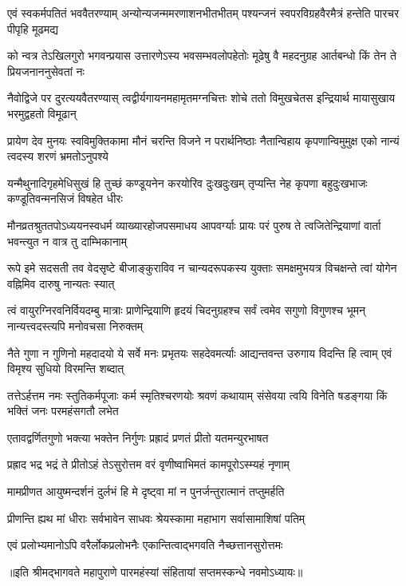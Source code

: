 \fourlineindentedshloka
{एवं स्वकर्मपतितं भववैतरण्याम्}
{अन्योन्यजन्ममरणाशनभीतभीतम्}
{पश्यन्जनं स्वपरविग्रहवैरमैत्रं}
{हन्तेति पारचर पीपृहि मूढमद्य} %

\fourlineindentedshloka
{को न्वत्र तेऽखिलगुरो भगवन्प्रयास}
{उत्तारणेऽस्य भवसम्भवलोपहेतोः}
{मूढेषु वै महदनुग्रह आर्तबन्धो}
{किं तेन ते प्रियजनाननुसेवतां नः} %

\fourlineindentedshloka
{नैवोद्विजे पर दुरत्ययवैतरण्यास्}
{त्वद्वीर्यगायनमहामृतमग्नचित्तः}
{शोचे ततो विमुखचेतस इन्द्रियार्थ}
{मायासुखाय भरमुद्वहतो विमूढान्} %

\fourlineindentedshloka
{प्रायेण देव मुनयः स्वविमुक्तिकामा}
{मौनं चरन्ति विजने न परार्थनिष्ठाः}
{नैतान्विहाय कृपणान्विमुमुक्ष एको}
{नान्यं त्वदस्य शरणं भ्रमतोऽनुपश्ये} %

\fourlineindentedshloka
{यन्मैथुनादिगृहमेधिसुखं हि तुच्छं}
{कण्डूयनेन करयोरिव दुःखदुःखम्}
{तृप्यन्ति नेह कृपणा बहुदुःखभाजः}
{कण्डूतिवन्मनसिजं विषहेत धीरः} %

\fourlineindentedshloka
{मौनव्रतश्रुततपोऽध्ययनस्वधर्म}
{व्याख्यारहोजपसमाधय आपवर्ग्याः}
{प्रायः परं पुरुष ते त्वजितेन्द्रियाणां}
{वार्ता भवन्त्युत न वात्र तु दाम्भिकानाम्} %

\fourlineindentedshloka
{रूपे इमे सदसती तव वेदसृष्टे}
{बीजाङ्कुराविव न चान्यदरूपकस्य}
{युक्ताः समक्षमुभयत्र विचक्षन्ते त्वां}
{योगेन वह्निमिव दारुषु नान्यतः स्यात्} %

\fourlineindentedshloka
{त्वं वायुरग्निरवनिर्वियदम्बु मात्राः}
{प्राणेन्द्रियाणि हृदयं चिदनुग्रहश्च}
{सर्वं त्वमेव सगुणो विगुणश्च भूमन्}
{नान्यत्त्वदस्त्यपि मनोवचसा निरुक्तम्} %

\fourlineindentedshloka
{नैते गुणा न गुणिनो महदादयो ये}
{सर्वे मनः प्रभृतयः सहदेवमर्त्याः}
{आद्यन्तवन्त उरुगाय विदन्ति हि त्वाम्}
{एवं विमृश्य सुधियो विरमन्ति शब्दात्} %

\fourlineindentedshloka
{तत्तेऽर्हत्तम नमः स्तुतिकर्मपूजाः}
{कर्म स्मृतिश्चरणयोः श्रवणं कथायाम्}
{संसेवया त्वयि विनेति षडङ्गया किं}
{भक्तिं जनः परमहंसगतौ लभेत} %



\twolineshloka
{एतावद्वर्णितगुणो भक्त्या भक्तेन निर्गुणः}
{प्रह्रादं प्रणतं प्रीतो यतमन्युरभाषत} %



\twolineshloka
{प्रह्राद भद्र भद्रं ते प्रीतोऽहं तेऽसुरोत्तम}
{वरं वृणीष्वाभिमतं कामपूरोऽस्म्यहं नृणाम्} %

\twolineshloka
{मामप्रीणत आयुष्मन्दर्शनं दुर्लभं हि मे}
{दृष्ट्वा मां न पुनर्जन्तुरात्मानं तप्तुमर्हति} %

\twolineshloka
{प्रीणन्ति ह्यथ मां धीराः सर्वभावेन साधवः}
{श्रेयस्कामा महाभाग सर्वासामाशिषां पतिम्} %


\twolineshloka
{एवं प्रलोभ्यमानोऽपि वरैर्लोकप्रलोभनैः}
{एकान्तित्वाद्भगवति नैच्छत्तानसुरोत्तमः} %

॥इति श्रीमद्भागवते महापुराणे पारमहंस्यां संहितायां सप्तमस्कन्धे नवमोऽध्यायः॥

